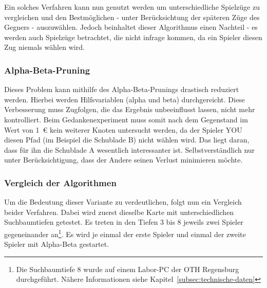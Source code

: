 \vspace{1em}
\begin{center}
    \label{fig:thought-experiment}
\end{center}
\vspace{1em}

Ein solches Verfahren kann nun genutzt werden um unterschiedliche Spielz\"uge zu vergleichen und den Bestm\"oglichen - unter Ber\"ucksichtung der sp\"ateren Z\"uge des Gegners - auszuw\"ahlen.
Jedoch beinhaltet dieser Algorithmus einen Nachteil - es werden auch Spielz\"uge betrachtet, die nicht infrage kommen, da ein Spieler diesen Zug niemals w\"ahlen wird.

\subsubsection{Alpha-Beta-Pruning}\label{subsubsec:alpha-beta-pruning}
Dieses Problem kann mithilfe des Alpha-Beta-Prunings drastisch reduziert werden.
Hierbei werden Hilfsvariablen (alpha und beta) durchgereicht.
Diese Verbesserung muss Zugfolgen, die das Ergebnis unbeeinflusst lassen, nicht mehr kontrolliert.
Beim Gedankenexperiment muss somit nach dem Gegenstand im Wert von 1~\euro{} kein weiterer Knoten untersucht werden, da der Spieler YOU diesen Pfad (im Beispiel die Schublade B) nicht w\"ahlen wird.
Das liegt daran, dass f\"ur ihn die Schublade A wesentlich interessanter ist.
Selbstverst\"andlich nur unter Ber\"ucksichtigung, dass der Andere seinen Verlust minimieren m\"ochte.

\subsubsection{Vergleich der Algorithmen}\label{subsubsec:vergleich-der-algorithmen}
Um die Bedeutung dieser Variante zu verdeutlichen, folgt nun ein Vergleich beider Verfahren.
Dabei wird zuerst dieselbe Karte mit unterschiedlichen Suchbaumtiefen getestet.
Es treten in den Tiefen 3 bis 8 jeweils zwei Spieler gegeneinander an\footnote{Die Suchbaumtiefe 8 wurde auf einem Labor-PC der OTH Regensburg durchgef\"uhrt. N\"ahere Informationen siehe Kapitel~\ref{subsec:technische-daten}}.
Es wird je einmal der erste Spieler und einmal der zweite Spieler mit Alpha-Beta gestartet.

